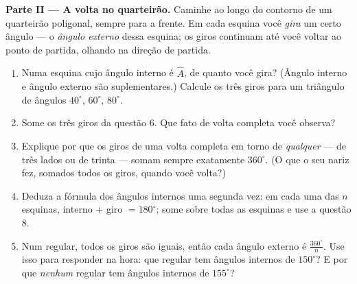 \begin{problem}
\medskip
\noindent\textbf{Parte II --- A volta no quarteirão.}
Caminhe ao longo do contorno de um quarteirão poligonal, sempre para a
frente. Em cada esquina você \emph{gira} um certo ângulo --- o
\emph{ângulo externo} dessa esquina; os giros continuam até você voltar
ao ponto de partida, olhando na direção de partida.
\begin{enumerate}[resume]
  \item Numa esquina cujo ângulo interno é $\widehat A$, de quanto você
        gira? (Ângulo interno e ângulo externo são suplementares.)
        Calcule os três giros para um triângulo de ângulos $40^\circ$,
        $60^\circ$, $80^\circ$.
  \item Some os três giros da questão 6. Que fato de volta completa
        você observa?
  \item Explique por que os giros de uma volta completa em torno de
        \emph{qualquer}  --- de três lados ou de trinta ---
        somam sempre exatamente $360^\circ$. (O que o seu nariz fez,
        somados todos os giros, quando você volta?)
  \item Deduza a fórmula dos ângulos internos uma segunda vez: em cada
        uma das $n$ esquinas, interno $+$ giro $= 180^\circ$; some
        sobre todas as esquinas e use a questão 8.
  \item Num  regular, todos os giros são iguais, então cada
        ângulo externo é $\frac{360^\circ}{n}$. Use isso para responder
        na hora: que  regular tem ângulos internos de
        $150^\circ$? E por que \emph{nenhum}  regular tem
        ângulos internos de $155^\circ$?
\end{enumerate}


\end{problem}
